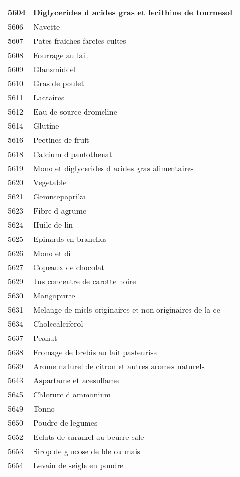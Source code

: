 \begin{longtable}{|l|l|}
5604 & Diglycerides d acides gras et lecithine de tournesol \\ \hline 
5606 & Navette \\ \hline 
5607 & Pates fraiches farcies cuites \\ \hline 
5608 & Fourrage au lait \\ \hline 
5609 & Glansmiddel \\ \hline 
5610 & Gras de poulet \\ \hline 
5611 & Lactaires \\ \hline 
5612 & Eau de source dromeline \\ \hline 
5614 & Glutine \\ \hline 
5616 & Pectines de fruit \\ \hline 
5618 & Calcium d pantothenat \\ \hline 
5619 & Mono et diglycerides d acides gras alimentaires \\ \hline 
5620 & Vegetable \\ \hline 
5621 & Gemusepaprika \\ \hline 
5623 & Fibre d agrume \\ \hline 
5624 & Huile de lin \\ \hline 
5625 & Epinards en branches \\ \hline 
5626 & Mono et di \\ \hline 
5627 & Copeaux de chocolat \\ \hline 
5629 & Jus concentre de carotte noire \\ \hline 
5630 & Mangopuree \\ \hline 
5631 & Melange de miels originaires et non originaires de la ce \\ \hline 
5634 & Cholecalciferol \\ \hline 
5637 & Peanut \\ \hline 
5638 & Fromage de brebis au lait pasteurise \\ \hline 
5639 & Arome naturel de citron et autres aromes naturels \\ \hline 
5643 & Aspartame et acesulfame \\ \hline 
5645 & Chlorure d ammonium \\ \hline 
5649 & Tonno \\ \hline 
5650 & Poudre de legumes \\ \hline 
5652 & Eclats de caramel au beurre sale \\ \hline 
5653 & Sirop de glucose de ble ou mais \\ \hline 
5654 & Levain de seigle en poudre \\ \hline 

\end{longtable}
